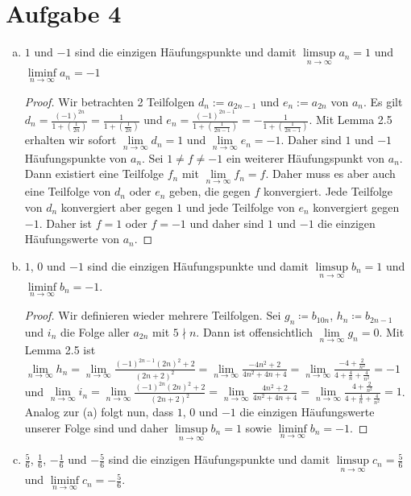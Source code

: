 \documentclass{article}
\newcommand{\mylim}{\lim\limits_{n\to \infty}}
\begin{document}
	\section*{Aufgabe 4}
	\begin{enumerate}[(a)]
		\item {} $1$ und $-1$ sind die einzigen Häufungspunkte und damit $\limsup\limits_{n\to \infty} a_n = 1$ und $\liminf\limits_{n\to \infty} a_n = -1$
		\begin{proof}
			Wir betrachten 2 Teilfolgen $d_n := a_{2n-1}$ und $e_n := a_{2n}$ von $a_n$. Es gilt $d_n = \frac{(-1)^{2n}}{1 + \left(\frac{1}{2n}\right)} = \frac{1}{1 + \left(\frac{1}{2n}\right)}$ und $e_n = \frac{(-1)^{2n-1}}{1 + \left(\frac{1}{2n-1}\right)} = -\frac{1}{1 + \left(\frac{1}{2n-1}\right)}$. Mit Lemma 2.5 erhalten wir sofort $\mylim d_n = 1$ und $\mylim e_n = -1$. Daher sind $1$ und $-1$ Häufungspunkte von $a_n$. Sei $1\neq f\neq -1$ ein weiterer Häufungspunkt von $a_n$. Dann existiert eine Teilfolge $f_n$ mit $\mylim f_n = f$. Daher muss es aber auch eine Teilfolge von $d_n$ oder $e_n$ geben, die gegen $f$ konvergiert. Jede Teilfolge von $d_n$ konvergiert aber gegen $1$ und jede Teilfolge von $e_n$ konvergiert gegen $-1$. Daher ist $f = 1$ oder $f= -1$ und daher sind $1$ und $-1$ die einzigen Häufungswerte von $a_n$.
		\end{proof}
		\item {} $1$, $0$ und $-1$ sind die einzigen Häufungspunkte und damit $\limsup\limits_{n\to \infty} b_n = 1$ und $\liminf\limits_{n\to \infty} b_n = -1$.
		\begin{proof}
			Wir definieren wieder mehrere Teilfolgen.
			Sei $g_n \coloneqq b_{10n}$, $h_n \coloneqq b_{2n-1}$ und $i_n$ die Folge aller $a_{2n}$ mit $5 \nmid n$.
			Dann ist offensichtlich $\mylim g_n = 0$.
			Mit Lemma 2.5 ist $\mylim h_n = \mylim \frac{(-1)^{2n-1}(2n)^2 + 2}{(2n+2)^2} = \mylim \frac{-4n^2 + 2}{4n^2 + 4n + 4} = \mylim \frac{-4 + \frac{2}{n^2}}{4 + \frac{4}{n} + \frac{4}{n^2}} = -1$ und $\mylim i_n = \mylim \frac{(-1)^{2n}(2n)^2 + 2}{(2n+2)^2} = \mylim \frac{4n^2 + 2}{4n^2 + 4n + 4} = \mylim \frac{4 + \frac{2}{n^2}}{4 + \frac{4}{n} + \frac{4}{n^2}} = 1$. Analog zur (a) folgt nun, dass $1$, $0$ und $-1$ die einzigen Häufungswerte unserer Folge sind und daher $\limsup\limits_{n\to \infty} b_n = 1$ sowie $\liminf\limits_{n\to \infty} b_n = -1$.
		\end{proof}
		\item {} $\frac{5}{6}$, $\frac{1}{6}$, $-\frac{1}{6}$ und $-\frac{5}{6}$ sind die einzigen Häufungspunkte und damit $\limsup\limits_{n\to \infty} c_n = \frac{5}{6}$ und $\liminf\limits_{n\to \infty} c_n = -\frac{5}{6}$.

\end{enumerate}
\end{document}
